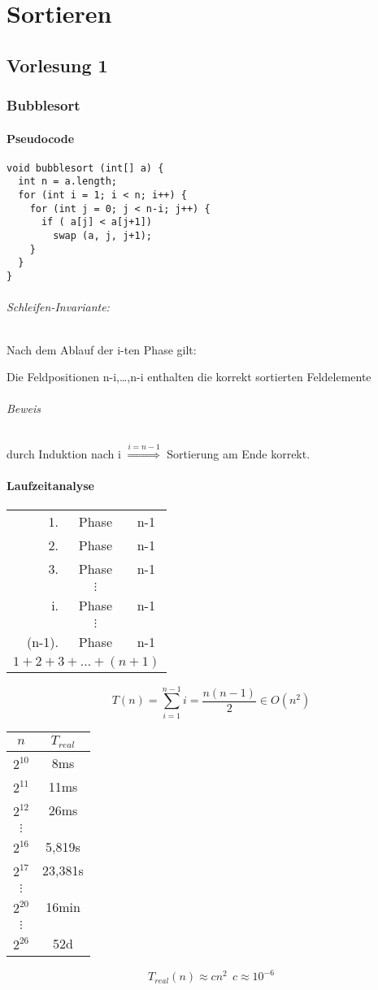 \part{Sortieren}
\chapter{Vorlesung 1}
\section{Bubblesort}
\subsection{Pseudocode}
\begin{lstlisting}
void bubblesort (int[] a) {
  int n = a.length;
  for (int i = 1; i < n; i++) {
    for (int j = 0; j < n-i; j++) {
      if ( a[j] < a[j+1])
        swap (a, j, j+1);
    }
  }
}
\end{lstlisting}
\paragraph{Schleifen-Invariante:} Nach dem Ablauf der i-ten Phase gilt:
\begin{center}
	Die Feldpositionen n-i,\ldots,n-i enthalten die korrekt sortierten Feldelemente
\end{center}
\paragraph{Beweis} durch Induktion nach i $\overset{i=n-1}{\Longrightarrow}$ Sortierung am Ende korrekt.
\subsection{Laufzeitanalyse}
\begin{tabular}{rcc}
	1.&Phase & n-1 \\
	2.&Phase & n-1 \\
	3.&Phase & n-1 \\
	 & $\vdots$ &  \\
	i.& Phase & n-1 \\
	 & $\vdots$ &  \\
	(n-1).&Phase & n-1 \\ \hline
	\multicolumn{3}{c}{$1+2+3+\ldots+(n+1)$}
\end{tabular}
\[ T(n)=\sum_{i=1}^{n-1} i = \frac{n(n-1)}{2}\in O(n^2) \]
\begin{tabular}{c|c}
	$n$ & $T_{real}$ \\ \hline
	$2^{10}$ & 8ms \\
	$2^{11}$ & 11ms \\
	$2^{12}$ & 26ms \\
	$\vdots$ &  \\
	$2^{16}$ & 5,819s \\
	$2^{17}$ & 23,381s \\
	$\vdots$ &  \\
	$2^{20}$ & 16min \\
	$\vdots$ &  \\
	$2^{26}$ & 52d 
\end{tabular}
\[ T_{real}(n)\approx cn^2~~ c\approx10^{-6}\]
